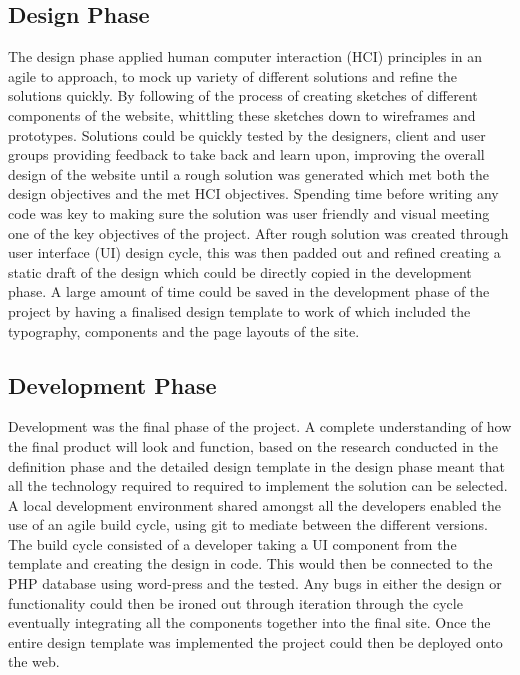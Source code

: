 \documentclass[fontsize=11pt]{extarticle}
\numberwithin{figure}{section} %
\begin{document}
\hypertarget{design-phase}{%
\subsection{Design Phase}\label{design-phase}}

The design phase applied human computer interaction (HCI) principles in
an agile to approach, to mock up variety of different solutions and
refine the solutions quickly. By following of the process of creating
sketches of different components of the website, whittling these
sketches down to wireframes and prototypes. Solutions could be quickly
tested by the designers, client and user groups providing feedback to
take back and learn upon, improving the overall design of the website
until a rough solution was generated which met both the design
objectives and the met HCI objectives. Spending time before writing any
code was key to making sure the solution was user friendly and visual
meeting one of the key objectives of the project. After rough solution
was created through user interface (UI) design cycle, this was then
padded out and refined creating a static draft of the design which could
be directly copied in the development phase. A large amount of time
could be saved in the development phase of the project by having a
finalised design template to work of which included the typography,
components and the page layouts of the site.

\hypertarget{development-phase}{%
\subsection{Development Phase}\label{development-phase}}

Development was the final phase of the project. A complete understanding
of how the final product will look and function, based on the research
conducted in the definition phase and the detailed design template in
the design phase meant that all the technology required to required to
implement the solution can be selected. A local development environment
shared amongst all the developers enabled the use of an agile build
cycle, using git to mediate between the different versions. The build
cycle consisted of a developer taking a UI component from the template
and creating the design in code. This would then be connected to the PHP
database using word-press and the tested. Any bugs in either the design
or functionality could then be ironed out through iteration through the
cycle eventually integrating all the components together into the final
site. Once the entire design template was implemented the project could
then be deployed onto the web.
\end{document}
